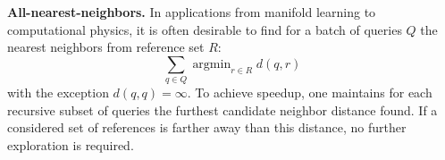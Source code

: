 \documentclass{article}
\DeclareMathOperator*{\argmin}{argmin}
\DeclareMathOperator*{\map}{map}
\newcommand{\spos}{^{{\scriptscriptstyle +\!}}}
\newcommand{\sneg}{^{{\scriptscriptstyle -\!}}}
\begin{document}
{\bf All-nearest-neighbors.} In applications from manifold learning to computational physics, it is often desirable to find for a batch of queries $Q$ the nearest neighbors from reference set $R$:
\begin{equation*}
\sum_{q \in Q} \argmin_{r \in R} d(q,r)
\end{equation*}
\noindent with the exception $d(q,q) = \infty$.
To achieve speedup, one maintains for each recursive subset of queries the furthest candidate neighbor distance found.
If a considered set of references is farther away than this distance, no further exploration is required.

\end{document}
